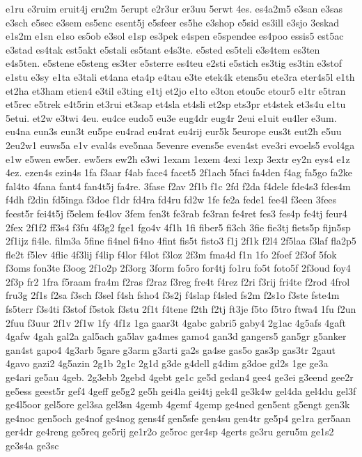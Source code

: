 {e1ru
e3ruim
eruit4j
eru2m
5erupt
e2r3ur
er3uu
5erwt
4es.
es4a2m5
e3san
e3sas
e3sch
e5sec
e3sem
es5enc
esent5j
e5sfeer
es5he
e3shop
e5sid
es3ill
e3sjo
3eskad
e1s2m
e1sn
e1so
es5ob
e3sol
e1sp
es3pek
e4spen
e5spendee
es4poo
essis5
est5ac
e3stad
es4tak
est5akt
e5stali
es5tant
e4s3te.
e5sted
es5teli
e3s4tem
es3ten
e4s5ten.
e5stene
e5steng
es3ter
e5sterre
es4teu
e2sti
e5stich
es3tig
es3tin
e3stof
e1stu
e3sy
e1ta
e3tali
et4ana
eta4p
e4tau
e3te
etek4k
etens5u
ete3ra
eter4s5l
e1th
et2ha
et3ham
etien4
e3til
e3ting
e1tj
et2jo
e1to
e3ton
etou5c
etour5
e1tr
e5tran
et5rec
e5trek
e4t5rin
et3rui
et3sap
et4sla
et4sli
et2sp
ets3pr
et4stek
et3s4u
e1tu
5etui.
et2w
e3twi
4eu.
eu4ce
eudo5
eu3e
eug4dr
eug4r
2eui
e1uit
eu4ler
e3um.
eu4na
eun3s
eun3t
eu5pe
eu4rad
eu4rat
eu4rij
eur5k
5europe
eus3t
eut2h
e5uu
2eu2w1
euws5a
e1v
eval4s
eve5naa
5evenre
evens5e
even4st
eve3ri
evoels5
evol4ga
e1w
e5wen
ew5er.
ew5ers
ew2h
e3wi
1exam
1exem
4exi
1exp
3extr
ey2n
eys4
e1z
4ez.
ezen4s
ezin4s
1fa
f3aar
f4ab
face4
facet5
2f1ach
5faci
fa4den
f4ag
fa5go
fa2ke
fal4to
4fana
fant4
fan4t5j
fa4re.
3fase
f2av
2f1b
f1c
2fd
f2da
f4dele
fde4s3
fdes4m
f4dh
f2din
fd5inga
f3doe
f1dr
fd4ra
fd4ru
fd2w
1fe
fe2a
fede1
fee4l
f3een
3fees
feest5r
fei4t5j
f5elem
fe4lov
3fem
fen3t
fe3rab
fe3ran
fe4ret
fes3
fes4p
fe4tj
feur4
2fex
2f1f2
ff3s4
f3fu
4f3g2
fge1
fgo4v
4f1h
1fi
fiber5
fi3ch
3fie
fie3tj
fiets5p
fijn5sp
2f1ijz
fi4le.
film3a
5fine
fi4nel
fi4no
4fint
fis5t
fisto3
f1j
2f1k
f2l4
2f5laa
f3laf
fla2p5
fle2t
f5lev
4flie
4f3lij
f4lip
f4lor
f4lot
f3loz
2f3m
fma4d
f1n
1fo
2foef
2f3of
5fok
f3oms
fon3te
f3oog
2f1o2p
2f3org
3form
fo5ro
for4tj
fo1ru
fo5t
foto5f
2f3oud
foy4
2f3p
fr2
1fra
f5raam
fra4m
f2ras
f2raz
f3reg
fre4t
f4rez
f2ri
f3rij
fri4te
f2rod
4frol
fru3g
2f1s
f2sa
f3sch
f3sel
f4sh
fsho4
f3s2j
f4slap
f4sled
fs2m
f2s1o
f3ste
fste4m
fs5terr
f3s4ti
f3stof
f5stok
f3stu
2f1t
f4tene
f2th
f2tj
ft3je
f5to
f5tro
ftwa4
1fu
f2un
2fuu
f3uur
2f1v
2f1w
1fy
4f1z
1ga
gaar3t
4gabc
gabri5
gaby4
2g1ac
4g5afs
4gaft
4gafw
4gah
gal2a
gal5ach
ga5lav
ga4mes
gamo4
gan3d
gangers5
gan5gr
g5anker
gan4st
gapo4
4g3arb
5gare
g3arm
g3arti
ga2s
ga4se
gas5o
gas3p
gas3tr
2gaut
4gavo
gazi2
4g5azin
2g1b
2g1c
2g1d
g3de
g4dell
g4dim
g3doe
gd2s
1ge
ge3a
ge4ari
ge5au
4geb.
2g3ebb
2gebd
4gebt
ge1c
ge5d
gedan4
gee4
ge3ei
g3eend
gee2r
ge5ess
geest5r
gef4
4geff
ge5g2
ge5h
gei4la
gei4tj
gek4l
ge3k4w
gel4da
gel4du
gel3f
ge4l5oor
gel5ore
gel3sa
gel3sn
4gemb
4gemf
4gemp
ge4ned
gen5ent
g5engt
gen3k
ge4noc
gen5och
ge4nof
ge4nog
gens4f
gen5sfe
gen4su
gen4tr
ge5p4
ge1ra
ger5aan
ger4dr
ge4reng
ge5req
ge5rij
ge1r2o
ge5roc
ger4sp
4gerts
ge3ru
geru5m
ge1s2
ge3s4a
ge3sc
}
